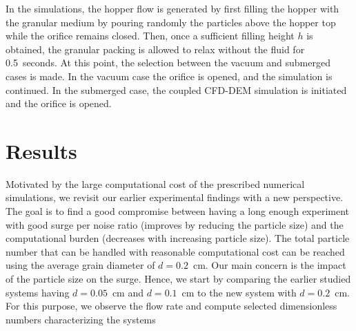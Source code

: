 \documentclass[twoside,twocolumn,9pt]{article}
\begin{document}
In the simulations, the hopper flow is generated by first filling the hopper with the granular medium by pouring 
randomly the particles above the hopper top while the orifice remains closed. Then, once a sufficient filling height $h$ is
obtained, the granular packing is allowed to relax without the fluid for 0.5~seconds. At this point, the selection between the 
vacuum and submerged cases is made. In the vacuum case the orifice is opened, and the simulation is continued.
In the submerged case, the coupled CFD-DEM simulation is initiated and the orifice is opened. 


\section{Results}

Motivated by the large computational cost of the prescribed numerical simulations, we revisit our earlier experimental findings with a new perspective.
The goal is to find a good compromise between having a long enough experiment with good surge per noise ratio (improves by reducing the particle size) and the computational burden (decreases with increasing particle size). The total particle number that can be handled with reasonable computational cost can be reached using the  average grain diameter of $d=0.2$~cm. 
Our main concern is the impact of the particle size on the surge. 
Hence, we start by comparing the earlier studied systems having $d=0.05$~cm and $d=0.1$~cm to the new system with $d=0.2$~cm. For this purpose, we observe the flow rate and compute selected dimensionless numbers characterizing the systems
\end{document}
